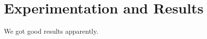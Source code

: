 \section{Experimentation and Results}
\label{section:results}
\label{section:experiments}

We got good results apparently.

